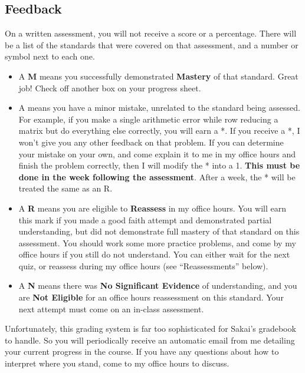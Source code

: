\documentclass[letterpaper]{article}
\begin{document}
\subsection*{\fontsize{10}{12}\selectfont Feedback}

On a written assessment, you will not receive a score or a percentage.  There will be a list of the standards that were covered on that assessment, and a number or symbol next to each one.
\begin{itemize}
\item A {\bf M} means you successfully demonstrated {\bf Mastery} of that standard.  Great job!  Check off another box on your progress sheet.
\item A {\bf *} means you have a minor mistake, unrelated to the standard being assessed.  For example, if you make a single arithmetic error while row reducing a matrix but do everything else correctly, you will earn a *.  If you receive a *, I won't give you any other feedback on that problem.  If you can determine your mistake on your own, and come explain it to me in my office hours and finish the problem correctly, then I will modify the * into a 1.  {\bf This must be done in the week following the assessment}.  After a week, the * will be treated the same as an R.
\item A {\bf R} means you are eligible to {\bf Reassess} in my office hours.  You will earn this mark if you made a good faith attempt and demonstrated partial understanding, but did not demonstrate full mastery of that standard on this assessment.  You should work some more practice problems, and come by my office hours if you still do not understand.  You can either wait for the next quiz, or reassess during my office hours (see ``Reassessments'' below).
\item A {\bf N} means there was {\bf No Significant Evidence} of understanding, and you are {\bf Not Eligible} for an office hours reassessment on this standard.  Your next attempt must come on an in-class assessment.  
\end{itemize}

Unfortunately, this grading system is far too sophisticated for Sakai's gradebook to handle.  So you will periodically receive an automatic email from me detailing your current progress in the course.  If you have any questions about how to interpret where you stand, come to my office hours to discuss.
\end{document}
